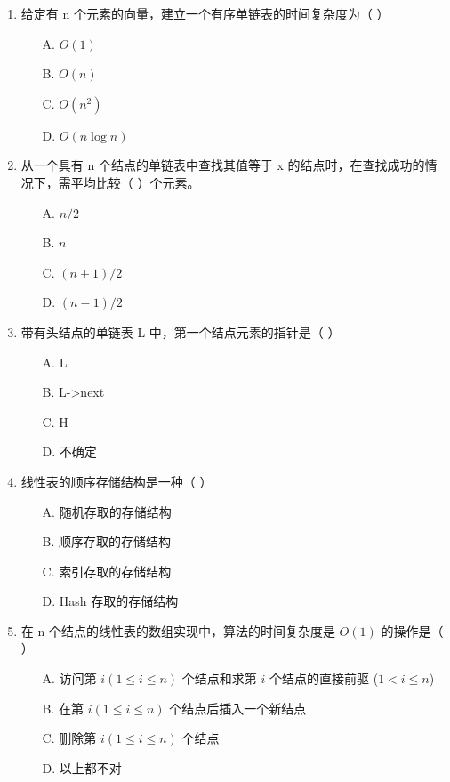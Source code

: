 \documentclass[12pt, a4paper]{article}
\begin{document}
\begin{enumerate}[label=\arabic*.]
	\item 给定有 n 个元素的向量，建立一个有序单链表的时间复杂度为（ ）
	      \begin{enumerate}
		      \item[A.] $O(1)$
		      \item[B.] $O(n)$
		      \item[C.] $O(n^2)$
		      \item[D.] $O(n \log n)$
	      \end{enumerate}

	\item 从一个具有 n 个结点的单链表中查找其值等于 x 的结点时，在查找成功的情况下，需平均比较（ ）个元素。
	      \begin{enumerate}
		      \item[A.] $n/2$
		      \item[B.] $n$
		      \item[C.] $(n+1)/2$
		      \item[D.] $(n-1)/2$
	      \end{enumerate}

	\item 带有头结点的单链表 L 中，第一个结点元素的指针是（ ）
	      \begin{enumerate}
		      \item[A.] L
		      \item[B.] L->next
		      \item[C.] H
		      \item[D.] 不确定
	      \end{enumerate}

	\item 线性表的顺序存储结构是一种（ ）
	      \begin{enumerate}
		      \item[A.] 随机存取的存储结构
		      \item[B.] 顺序存取的存储结构
		      \item[C.] 索引存取的存储结构
		      \item[D.] Hash 存取的存储结构
	      \end{enumerate}

	\item 在 n 个结点的线性表的数组实现中，算法的时间复杂度是 $O(1)$ 的操作是（ ）
	      \begin{enumerate}
		      \item[A.] 访问第 $i (1 \le i \le n)$ 个结点和求第 $i$ 个结点的直接前驱 ($1 < i \le n$)
		      \item[B.] 在第 $i (1 \le i \le n)$ 个结点后插入一个新结点
		      \item[C.] 删除第 $i (1 \le i \le n)$ 个结点
		      \item[D.] 以上都不对
	      \end{enumerate}


\end{enumerate}
\end{document}
